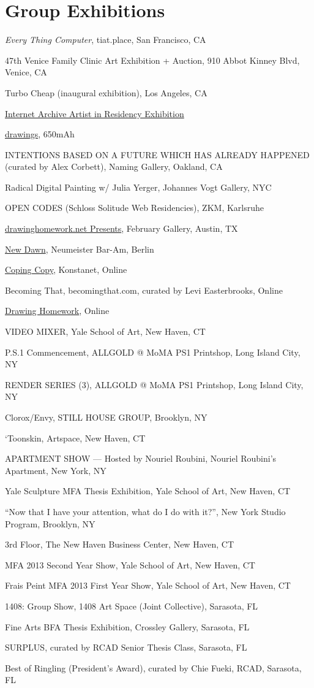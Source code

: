 \documentclass[10pt,letterpaper]{article}
\newlength{\cvyearwidth}
\newenvironment{cvlist}{%
  \begin{list}{}{%
    \setlength{\leftmargin}{\cvyearwidth}%
    \setlength{\labelwidth}{\cvyearwidth}%
    \setlength{\labelsep}{0.4em}%
    \setlength{\itemsep}{0.15em}%
    \setlength{\parsep}{0pt}%
    \setlength{\topsep}{0.2em}%
    \renewcommand{\makelabel}[1]{\color{acgray}\small ##1\hfill}%
  }%
}{\end{list}}
\newcommand{\cv}[2]{\item[#1] #2}
\begin{document}
\section*{Group Exhibitions}
\begin{cvlist}
  \cv{2026}{\emph{Every Thing Computer}, tiat.place, San Francisco, CA}
  \cv{2026}{47th Venice Family Clinic Art Exhibition + Auction, 910 Abbot Kinney Blvd, Venice, CA}
  \cv{2025}{Turbo Cheap (inaugural exhibition), Los Angeles, CA}
  \cv{2019}{\href{https://blog.archive.org/2019/06/22/the-internet-archives-2019-artist-in-residency-exhibition}{Internet Archive Artist in Residency Exhibition}}
  \cv{2018}{\href{http://www.650mah.com/drawings.html}{drawings}, 650mAh}
  \cv{2018}{INTENTIONS BASED ON A FUTURE WHICH HAS ALREADY HAPPENED (curated by Alex Corbett), Naming Gallery, Oakland, CA}
  \cv{2018}{Radical Digital Painting w/ Julia Yerger, Johannes Vogt Gallery, NYC}
  \cv{2018}{OPEN CODES (Schloss Solitude Web Residencies), ZKM, Karlsruhe}
  \cv{2017}{\href{http://february.today/drawinghomework}{drawinghomework.net Presents}, February Gallery, Austin, TX}
  \cv{2017}{\href{http://neumeisterbaram.com/exhibition/newdawn}{New Dawn}, Neumeister Bar-Am, Berlin}
  \cv{2017}{\href{http://konstanet.com}{Coping Copy}, Konstanet, Online}
  \cv{2016}{Becoming That, becomingthat.com, curated by Levi Easterbrooks, Online}
  \cv{2016}{\href{http://www.drawinghomework.net/jeffrey.html}{Drawing Homework}, Online}
  \cv{2015}{VIDEO MIXER, Yale School of Art, New Haven, CT}
  \cv{2015}{P.S.1 Commencement, ALLGOLD @ MoMA PS1 Printshop, Long Island City, NY}
  \cv{2015}{RENDER SERIES (3), ALLGOLD @ MoMA PS1 Printshop, Long Island City, NY}
  \cv{2015}{Clorox/Envy, STILL HOUSE GROUP, Brooklyn, NY}
  \cv{2013}{`Toonskin, Artspace, New Haven, CT}
  \cv{2013}{APARTMENT SHOW --- Hosted by Nouriel Roubini, Nouriel Roubini's Apartment, New York, NY}
  \cv{2013}{Yale Sculpture MFA Thesis Exhibition, Yale School of Art, New Haven, CT}
  \cv{2013}{``Now that I have your attention, what do I do with it?'', New York Studio Program, Brooklyn, NY}
  \cv{2012}{3rd Floor, The New Haven Business Center, New Haven, CT}
  \cv{2012}{MFA 2013 Second Year Show, Yale School of Art, New Haven, CT}
  \cv{2011}{Frais Peint MFA 2013 First Year Show, Yale School of Art, New Haven, CT}
  \cv{2011}{1408: Group Show, 1408 Art Space (Joint Collective), Sarasota, FL}
  \cv{2011}{Fine Arts BFA Thesis Exhibition, Crossley Gallery, Sarasota, FL}
  \cv{2011}{SURPLUS, curated by RCAD Senior Thesis Class, Sarasota, FL}
  \cv{2011}{Best of Ringling (President's Award), curated by Chie Fueki, RCAD, Sarasota, FL}

\end{cvlist}
\end{document}

